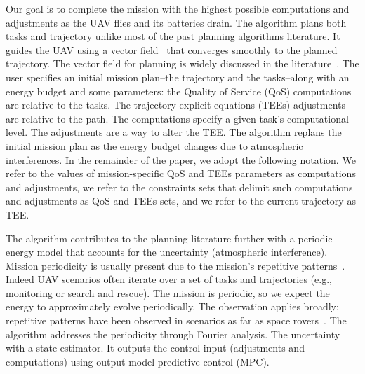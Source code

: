 \documentclass[letterpaper,10pt,conference]{ieeeconf}
\theoremstyle{definition}
\begin{document}
Our goal is to complete the mission with the highest possible computations and adjustments as the UAV flies and its batteries drain. 
The algorithm plans both tasks and trajectory unlike most of the past planning algorithms literature. It guides the UAV using a vector field~\cite{de2017guidance} that converges smoothly to the planned trajectory. The vector field for planning is widely discussed in the literature~\cite{lindemann2005smoothly,gonccalves2010vector,panagou2014motion,zhou2014vector,kapitanyuk2017guiding}. 
The user specifies an initial mission plan--the trajectory and the tasks--along with an energy budget and some parameters: the Quality of Service (QoS) computations are relative to the tasks. The trajectory-explicit equations (TEEs) adjustments are relative to the path. The computations specify a given task's computational level. The adjustments are a way to alter the TEE. The algorithm replans the initial mission plan as the energy budget changes due to atmospheric interferences.
In the remainder of the paper, we adopt the following notation. We refer to the values of mission-specific QoS and TEEs parameters as computations and adjustments, we refer to the constraints sets that delimit such computations and adjustments as QoS and TEEs sets, and we refer to the current trajectory as TEE. 

The algorithm contributes to the planning literature further with a periodic energy model that accounts for the uncertainty (atmospheric interference). Mission periodicity is usually present due to the mission's repetitive patterns~\cite{seewald2020mechanical}. Indeed UAV scenarios often iterate over a set of tasks and trajectories (e.g., monitoring or search and rescue). The mission is periodic, so we expect the energy to approximately evolve periodically. The observation applies broadly; repetitive patterns have been observed in scenarios as far as space rovers~\cite{seewald2020beyond}. The algorithm addresses the periodicity through Fourier analysis. The uncertainty with a state estimator. It outputs the control input (adjustments and computations) using output model predictive control (MPC).
\end{document}
